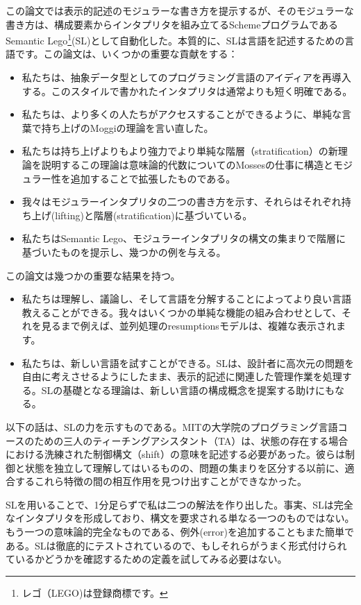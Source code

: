 \documentclass[11pt, oneside]{jsarticle}   	%
\begin{document}
この論文では表示的記述のモジュラーな書き方を提示するが、そのモジュラーな書き方は、構成要素からインタプリタを組み立てるSchemeプログラムであるSemantic Lego\footnote{レゴ（LEGO)は登録商標です。}(SL)として自動化した。本質的に、SLは言語を記述するための言語です。この論文は、いくつかの重要な貢献をする：
\begin{itemize}
\item 私たちは、抽象データ型としてのプログラミング言語のアイディアを再導入する。このスタイルで書かれたインタプリタは通常よりも短く明確である。

\item 私たちは、より多くの人たちがアクセスすることができるように、単純な言葉で持ち上げのMoggiの理論を言い直した。

\item 私たちは持ち上げよりもより強力でより単純な階層（stratification）の新理論を説明するこの理論は意味論的代数についてのMossesの仕事に構造とモジュラー性を追加することで拡張したものである。

\item 我々はモジュラーインタプリタの二つの書き方を示す、それらはそれぞれ持ち上げ(lifting)と階層(stratification)に基づいている。

\item 私たちはSemantic Lego、モジュラーインタプリタの構文の集まりで階層に基づいたものを提示し、幾つかの例を与える。
\end{itemize}
この論文は幾つかの重要な結果を持つ。
\begin{itemize}
\item 私たちは理解し、議論し、そして言語を分解することによってより良い言語教えることができる。我々はいくつかの単純な機能の組み合わせとして、それを見るまで例えば、並列処理のresumptionsモデルは、複雑な表示されます。

\item 私たちは、新しい言語を試すことができる。SLは、設計者に高次元の問題を自由に考えさせるようにしたまま、表示的記述に関連した管理作業を処理する。SLの基礎となる理論は、新しい言語の構成概念を提案する助けにもなる。
\end{itemize}
以下の話は、SLの力を示すものである。MITの大学院のプログラミング言語コースのための三人のティーチングアシスタント（TA）は、状態の存在する場合における洗練された制御構文（shift）の意味を記述する必要があった。彼らは制御と状態を独立して理解してはいるものの、問題の集まりを区分する以前に、適合するこれら特徴の間の相互作用を見つけ出すことができなかった。

SLを用いることで、1分足らずで私は二つの解法を作り出した。事実、SLは完全なインタプリタを形成しており、構文を要求される単なる一つのものではない。もう一つの意味論的完全なものである、例外(error)を追加することもまた簡単である。SLは徹底的にテストされているので、もしそれらがうまく形式付けられているかどうかを確認するための定義を試してみる必要はない。
\end{document}
